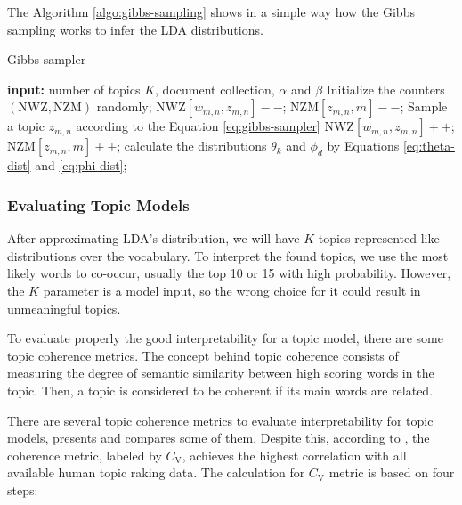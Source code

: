 	The Algorithm \ref{algo:gibbs-sampling} shows in a simple way how the Gibbs sampling works to infer the LDA distributions.

	\begin{algorithm}[h!]
		\caption{Gibbs sampler}
		\label{algo:gibbs-sampling}
		\begin{algorithmic}[1]
			\State \textbf{input:} number of topics $K$, document collection, $\alpha$ and $\beta$
			\Begin
			\State Initialize the counters $(\text{NWZ}, \text{NZM})$ randomly;
			\State $\text{NWZ}[w_{m,n}, z_{m,n}]--$; $\text{NZM}[z_{m,n},m]--$;
			\State Sample a topic $z_{m,n}$ according to the Equation \ref{eq:gibbs-sampler}
			\State $\text{NWZ}[w_{m,n}, z_{m,n}]++$; $\text{NZM}[z_{m,n},m]++$;
			\EndFor
			\EndFor
			\State calculate the distributions $\theta_{k}$ and $\phi_{d}$ by Equations \ref{eq:theta-dist} and \ref{eq:phi-dist};
			\EndIf
			\EndWhile
			\End
		\end{algorithmic}
	\end{algorithm}

	\subsubsection{Evaluating Topic Models}

	After approximating LDA's distribution, we will have $K$ topics represented like distributions over the vocabulary. To interpret the found topics, we use the most likely words to co-occur, usually the top 10 or 15 with high probability. However, the $K$ parameter is a model input, so the wrong choice for it could result in unmeaningful topics.

	To evaluate properly the good interpretability for a topic model, there are some topic coherence metrics. The concept behind topic coherence consists of measuring the degree of semantic similarity between high scoring words in the topic. Then, a topic is considered to be coherent if its main words are related.

	There are several topic coherence metrics to evaluate interpretability for topic models,  presents and compares some of them.
	Despite this, according to , the coherence metric, labeled by $C_{\text{V}}$, achieves the highest correlation with all available human topic raking data. The calculation for $C_{\text{V}}$ metric is based on four steps:

